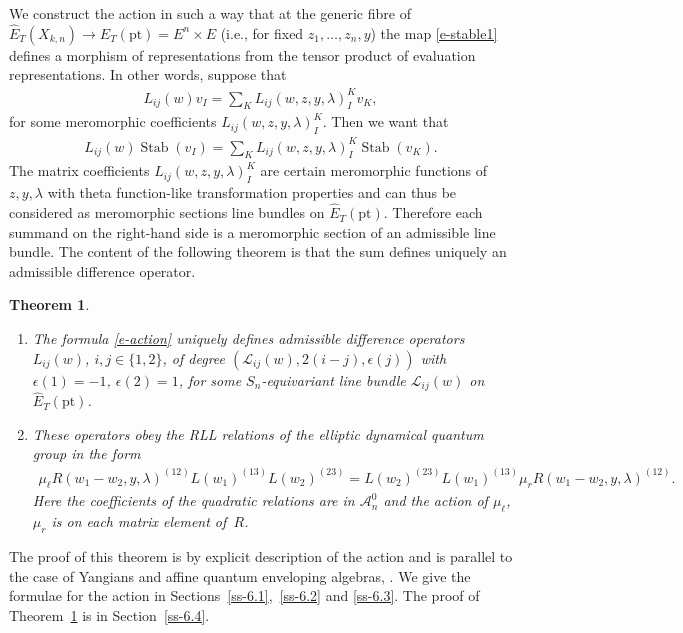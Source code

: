 \documentclass[10pt,a4paper]{amsart}
\numberwithin{equation}{section}
\newtheorem{Theorem}{Theorem}[section]
\begin{document}
We construct the action in such a way that at the generic fibre of $\hat E_T(X_{k,n})\to E_T(\mathrm{pt})=E^n\times E$ (i.e., for fixed $z_1,\dots,z_n,y$) the map \eqref{e-stable1} defines a morphism of representations from the tensor product of evaluation representations. In other words, suppose that
\begin{gather*}
 L_{ij}(w)v_I=\sum_K L_{ij}(w,z,y,\lambda)_I^Kv_K,
\end{gather*}
for some meromorphic coefficients $L_{ij}(w,z,y,\lambda)_I^K$. Then we want that
\begin{gather}\label{e-action}
 L_{ij}(w)\operatorname{Stab}(v_I) =\sum_K L_{ij}(w,z,y,\lambda)_I^K\operatorname{Stab}(v_K).
\end{gather}
The matrix coefficients $L_{ij}(w,z,y,\lambda)_I^K$ are certain meromorphic functions of $z,y,\lambda$ with theta function-like transformation properties and can thus be considered as meromorphic sections line bundles on $\hat E_T(\mathrm{pt})$. Therefore each summand on the right-hand side is a meromorphic section of an admissible line bundle. The content of the following theorem is that the sum defines uniquely an admissible difference operator.
\begin{Theorem}\label{th-2}\quad
\begin{enumerate}\itemsep=0pt
\item[$(i)$] The formula \eqref{e-action} uniquely defines admissible difference operators $L_{ij}(w)$, $i,j\in\{1,2\}$, of degree $(\mathcal L_{ij}(w),2(i-j),\epsilon(j))$ with $\epsilon(1)=-1$, $\epsilon(2)=1$, for some $S_n$-equivariant line bundle $\mathcal L_{ij}(w)$ on $\hat E_T(\mathrm{pt})$.
\item[$(ii)$] These operators obey the RLL relations of the elliptic dynamical quantum group in the form
 \begin{gather*}
 \mu_\ell R(w_1\!-w_2,y,\lambda)^{(12)} L(w_1)^{(13)} L(w_2)^{(23)} = L(w_2)^{(23)}L(w_1)^{(13)} \mu_rR(w_1\!-w_2,y,\lambda)^{(12)}.
 \end{gather*}
 Here the coefficients of the quadratic relations are in $\mathcal A^0_n$ and the action of $\mu_\ell$, $\mu_r$ is on each matrix element of~$R$.
\end{enumerate}
\end{Theorem}

The proof of this theorem is by explicit description of the action and is parallel to the case of Yangians and affine quantum enveloping algebras, \cite{GRTV,RTV2,RV2}. We give the formulae for the action in Sections~\ref{ss-6.1},~\ref{ss-6.2} and \ref{ss-6.3}. The proof of Theorem~\ref{th-2} is in Section~\ref{ss-6.4}.
\end{document}
